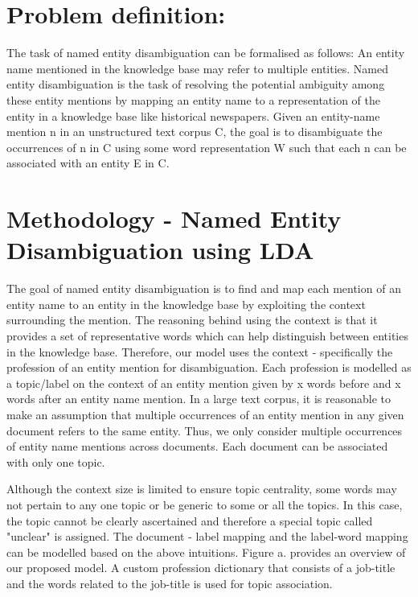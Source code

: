 \section{Problem definition:}
The task of named entity disambiguation can be formalised as follows:
An entity name mentioned in the knowledge base may refer to multiple entities. Named entity disambiguation is the task of resolving the potential ambiguity among these entity mentions by mapping an entity name to a representation of the entity in a knowledge base like historical newspapers. Given an entity-name mention n in an unstructured text corpus C, the goal is to disambiguate the occurrences of n in C using some word representation W such that each n can be associated with an entity E in C. 

\section{Methodology - Named Entity Disambiguation using LDA}
The goal of named entity disambiguation is to find and map each mention of an entity name to an entity in the knowledge base by exploiting the context surrounding the mention. The reasoning behind using the context is that it provides a set of representative words which can help distinguish between entities in the knowledge base. Therefore, our model uses the context - specifically the profession of an entity mention for disambiguation. Each profession is modelled as a topic/label on the context of an entity mention given by x words before and x words after an entity name mention.  In a large text corpus, it is reasonable to make an assumption that multiple occurrences of an entity mention in any given document refers to the same entity. Thus, we only consider multiple occurrences of entity name mentions across documents. Each document can be associated with only one topic. 

Although the context size is limited to ensure topic centrality, some words may not pertain to any one topic or be generic to some or all the topics. In this case, the topic cannot be clearly ascertained and therefore a special topic called "unclear" is assigned. The document - label mapping and the label-word mapping can be modelled based on the above intuitions. Figure a. provides an overview of our proposed model. A custom profession dictionary that consists of a job-title and the words related to the job-title is used for topic association.
